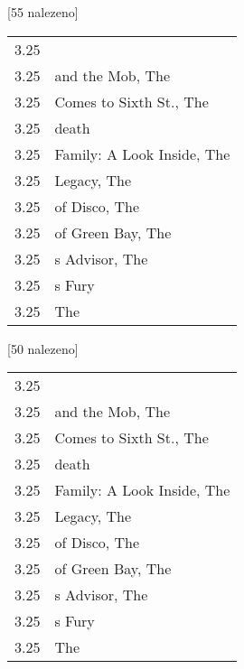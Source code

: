\begin{table}[H]
\begin{tt}

\horizlina

\noindent
\begin{minipage}[t]{.5\textwidth}\vspace{0pt}
 [55 nalezeno]\vspace{5pt}

\begin{tabulary}{1.1\textwidth}{LL}
3.25 &  \\
3.25 &  and the Mob, The \\
3.25 &  Comes to Sixth St., The \\
3.25 &  death \\
3.25 &  Family: A Look Inside, The \\
3.25 &  Legacy, The \\
3.25 &  of Disco, The \\
3.25 &  of Green Bay, The \\
3.25 & s Advisor, The \\
3.25 & s Fury \\
3.25 &  The \\
\end{tabulary}
\end{minipage}
\begin{minipage}[t]{.5\textwidth}\vspace{0pt}
 [50 nalezeno]\vspace{5pt}

\begin{tabulary}{1.1\textwidth}{LL}
3.25 &  \\
3.25 &  and the Mob, The \\
3.25 &  Comes to Sixth St., The \\
3.25 &  death \\
3.25 &  Family: A Look Inside, The \\
3.25 &  Legacy, The \\
3.25 &  of Disco, The \\
3.25 &  of Green Bay, The \\
3.25 & s Advisor, The \\
3.25 & s Fury \\
3.25 &  The \\
\end{tabulary}
\end{minipage}


\end{tt}
\end{table}
